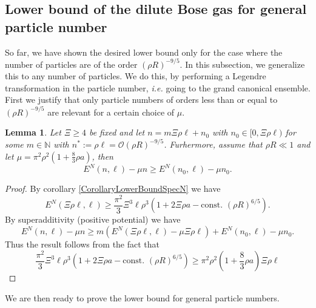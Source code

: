 \documentclass[a4paper,11pt]{article}
\newcommand{\ie}{\emph{i.e.} }
\newtheorem{lemma}{Lemma}
\numberwithin{equation}{section}
\begin{document}
	\subsection{Lower bound of the dilute Bose gas for general particle number}
	So far, we have shown the desired lower bound only for the case where the number of particles are of the order $ (\rho R)^{-9/5} $. In this subsection, we generalize this to any number of particles. We do this, by performing a Legendre transformation in the particle number, \ie going to the grand canonical ensemble. First we justify that only particle numbers of orders less than or equal to $ (\rho R)^{-9/5} $ are relevant for a certain choice of $ \mu $.
		\begin{lemma}\label{LemmaLocalizationFbound}
			Let $ \Xi\geq 4 $ be fixed and let $ n=m\Xi \rho \ell+n_0 $ with $ n_0\in[0,\Xi\rho \ell) $ for some $ m\in\mathbb{N} $ with $ n^{\ast}:=\rho\ell=\mathcal{O}(\rho R)^{-9/5} $. Furhermore, assume that $ \rho R\ll 1 $ and let $ \mu=\pi^2\rho^2\left(1+\frac{8}{3}\rho a\right) $, then \begin{equation}
			E^{N}(n,\ell)-\mu n \geq E^{N}(n_0,\ell)-\mu n_0.
			\end{equation}
		\end{lemma}
		\begin{proof}
			By corollary \ref{CorollaryLowerBoundSpecN} we have \begin{equation}
			E^{N}(\Xi\rho\ell,\ell)\geq\frac{\pi^2}{3}\Xi^3\ell\rho^3\left(1+2\Xi\rho a-\text{const. }(\rho R)^{6/5}\right).
			\end{equation}
			By superadditivity (positive potential) we have \begin{equation}
			E^N(n,\ell)-\mu n\geq m\left(E^N(\Xi\rho\ell,\ell)-\mu\Xi\rho\ell \right)+E^N(n_0,\ell)-\mu n_0.
			\end{equation}
			Thus the result follows from the fact that \begin{equation}
			\frac{\pi^2}{3}\Xi^3\ell\rho^3\left(1+2\Xi\rho a-\text{const. }(\rho R)^{6/5}\right)\geq \pi^2\rho^2\left(1+\frac{8}{3}\rho a\right) \Xi\rho\ell
			\end{equation}
		\end{proof}
	We are then ready to prove the lower bound for general particle numbers.
	
\end{document}
